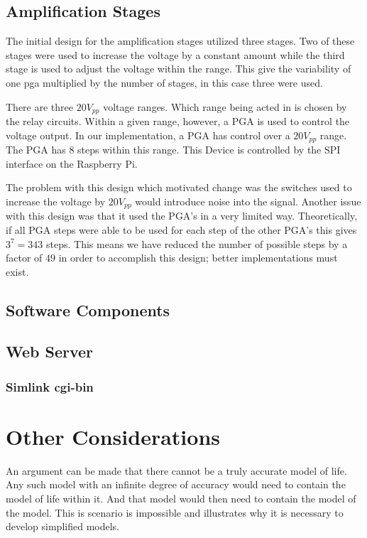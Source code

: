 \documentclass{article}	%
\begin{document}
\begin{multicols}{2}
\subsection{Amplification Stages}
The initial design for the amplification stages
utilized three stages.
Two of these stages were used to increase the voltage by a constant amount while
the third stage is used to adjust the voltage within the range.
This give the variability of one pga multiplied by the number of stages,
in this case three were used.

There are three $20V_{pp}$ voltage ranges.
Which range being acted in is chosen by the relay circuits.
Within a given range,
however,
a PGA is used to control the voltage output.
In our implementation,
a PGA has control over a $20V_{pp}$ range.
The PGA has 8 steps within this range.
This Device is controlled by 
the SPI interface on the Raspberry Pi.

The problem with this design which motivated change was
the switches used to increase the voltage
by $20V_{pp}$ would introduce noise into the signal.
Another issue with this design was that
it used the PGA's in a very limited way.
Theoretically, if all PGA steps were able to
be used for each step of the other PGA's
this gives $3^7 = 343$ steps.
This means we have reduced the number of possible
steps by a factor of $49$ in order to accomplish
this design; better implementations must exist.


\subsection{Software Components}
\subsection{Web Server}

\subsubsection{Simlink cgi-bin}

\newpage
\section{Other Considerations}
An argument can be made that there
cannot be a truly accurate model of life.
Any such model with an infinite degree of accuracy
would need to contain the model of life within it.
And that model would then need to contain
the model of the model.
This is scenario is impossible and 
illustrates why it is necessary to develop
simplified models.


\end{multicols}
\end{document}
